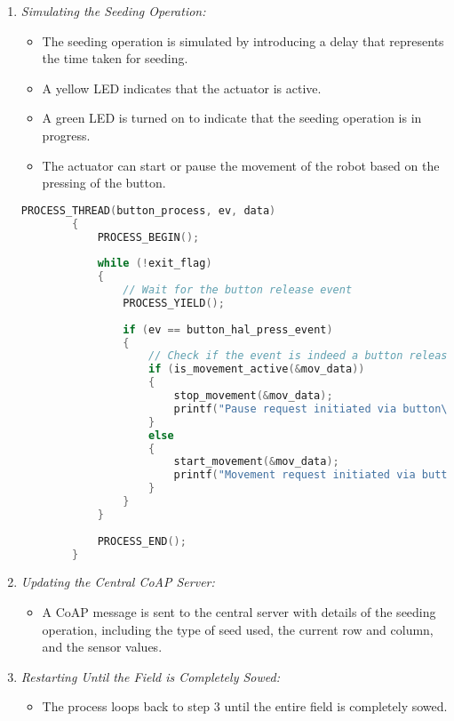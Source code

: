 \begin{enumerate}
    \item \textit{Simulating the Seeding Operation:}
    \begin{itemize}
        \item The seeding operation is simulated by introducing a delay that represents the time taken for seeding.
        \item A yellow LED indicates that the actuator is active.
        \item A green LED is turned on to indicate that the seeding operation is in progress.
        \item The actuator can start or pause the movement of the robot based on the pressing of the button.
    \end{itemize}

    \begin{lstlisting}[language=C]
        PROCESS_THREAD(button_process, ev, data)
        {
            PROCESS_BEGIN();
        
            while (!exit_flag)
            {
                // Wait for the button release event
                PROCESS_YIELD();
        
                if (ev == button_hal_press_event)
                {
                    // Check if the event is indeed a button release event
                    if (is_movement_active(&mov_data))
                    {
                        stop_movement(&mov_data);
                        printf("Pause request initiated via button\n");
                    }
                    else
                    {
                        start_movement(&mov_data);
                        printf("Movement request initiated via button\n");
                    }
                }
            }
        
            PROCESS_END();
        }
        \end{lstlisting}
   
    
    \item \textit{Updating the Central CoAP Server:}
    \begin{itemize}
        \item A CoAP message is sent to the central server with details of the seeding operation, including the type of seed used, the current row and column, and the sensor values.
    \end{itemize}
    
    \item \textit{Restarting Until the Field is Completely Sowed:}
    \begin{itemize}
        \item The process loops back to step 3 until the entire field is completely sowed.
    \end{itemize}
    
\end{enumerate}

